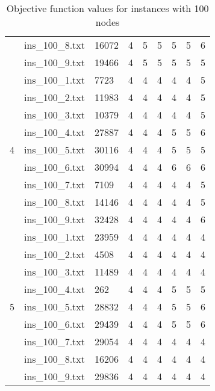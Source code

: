\begin{table}[]
\begin{tabular}{lllllllll}
& ins\_100\_8.txt & 16072 & 4 & 5 & 5 & 5  & 5  & 6 \\
& ins\_100\_9.txt & 19466 & 4 & 5 & 5 & 5  & 5  & 5 \\
\hline 
\multirow{9}{*}{4}
& ins\_100\_1.txt & 7723  & 4 & 4 & 4 & 4  & 4  & 5 \\
& ins\_100\_2.txt & 11983 & 4 & 4 & 4 & 4  & 4  & 5 \\
& ins\_100\_3.txt & 10379 & 4 & 4 & 4 & 4  & 4  & 5 \\
& ins\_100\_4.txt & 27887 & 4 & 4 & 4 & 5  & 5  & 6 \\
& ins\_100\_5.txt & 30116 & 4 & 4 & 4 & 5  & 5  & 5 \\
& ins\_100\_6.txt & 30994 & 4 & 4 & 4 & 6  & 6  & 6 \\
& ins\_100\_7.txt & 7109  & 4 & 4 & 4 & 4  & 4  & 5 \\
& ins\_100\_8.txt & 14146 & 4 & 4 & 4 & 4  & 4  & 5 \\
& ins\_100\_9.txt & 32428 & 4 & 4 & 4 & 4  & 4  & 6 \\
\hline 
\multirow{9}{*}{5}
& ins\_100\_1.txt & 23959 & 4 & 4 & 4 & 4  & 4  & 4 \\
& ins\_100\_2.txt & 4508  & 4 & 4 & 4 & 4  & 4  & 4 \\
& ins\_100\_3.txt & 11489 & 4 & 4 & 4 & 4  & 4  & 4 \\
& ins\_100\_4.txt & 262   & 4 & 4 & 4 & 5  & 5  & 5 \\
& ins\_100\_5.txt & 28832 & 4 & 4 & 4 & 5  & 5  & 6 \\
& ins\_100\_6.txt & 29439 & 4 & 4 & 4 & 5  & 5  & 6 \\
& ins\_100\_7.txt & 29054 & 4 & 4 & 4 & 4  & 4  & 4 \\
& ins\_100\_8.txt & 16206 & 4 & 4 & 4 & 4  & 4  & 4 \\
& ins\_100\_9.txt & 29836 & 4 & 4 & 4 & 4  & 4  & 4
\end{tabular}
\caption{Objective function values for instances with 100 nodes}
\label{tab:ins100}
\end{table}
